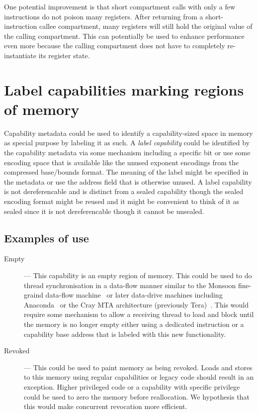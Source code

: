 One potential improvement is that short compartment calls with only a few instructions do not poison many registers.
After returning from a short-instruction callee compartment, many registers will still hold the original value of the calling compartment.
This can potentially be used to enhance performance even more because the calling compartment does not have to completely re-instantiate its register state.


\section{Label capabilities marking regions of memory}

Capability metadata could be used to identify a capability-sized space
in memory as special purpose by labeling it as such.  A \textit{label
  capability} could be identified by the capability metadata via some
mechanism including a specific bit or use some encoding space that is
available like the unused exponent encodings from the compressed
base/bounds format.  The meaning of the label might be specified in
the metadata or use the address field that is otherwise unused.  A
label capability is not dereferencable and is distinct from a sealed
capability though the sealed encoding format might be reused and it
might be convenient to think of it as sealed since it is not
dereferencable though it cannot be unsealed.

\subsection{Examples of use}

\begin{description}
  \item[Empty] --- This capability is an empty region of memory. This
    could be used to do thread synchronisation in a data-flow manner
    similar to the Monsoon fine-graind data-flow
    machine~\cite{Monsoon1990} or later data-drive machines including
    Anaconda~\cite{UCAM-CL-TR-358} or the Cray MTA architecture
    (previously Tera)~\cite{Tera1998}. This would require some
    mechanism to allow a receiving thread to load and block until the
    memory is no longer empty either using a dedicated instruction or
    a capability base address that is labeled with this new
    functionality.
  \item[Revoked] --- This could be used to paint memory as being
    revoked.  Loads and stores to this memory using regular
    capabilities or legacy code should result in an exception. Higher
    privileged code or a capability with specific privilege could be
    used to zero the memory before reallocation.  We hypothesis that
    this would make concurrent revocation more efficient.
\end{description}

